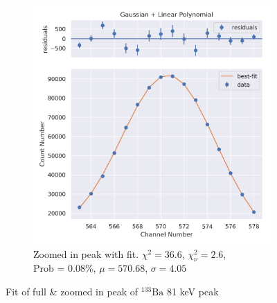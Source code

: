 \documentclass[11pt,a4paper]{article}
\newcommand{\element}[2]{$^{#2}\textrm{#1}$}
\begin{document}
\begin{figure}[H]
\begin{subfigure}{.5\linewidth}
    \includegraphics[width=\linewidth]{./Images/Barium133/Linear/Linear_1_Zoom.png}
    \caption{Zoomed in peak with fit. $\chi^2 = 36.6$, $\chi^2_\nu = 2.6$, \\ Prob = 0.08\%, $\mu = 570.68$, $\sigma = 4.05$}
  \end{subfigure}
  \caption{Fit of full \& zoomed in peak of \element{Ba}{133} 81 keV peak}
\end{figure}
\end{document}
